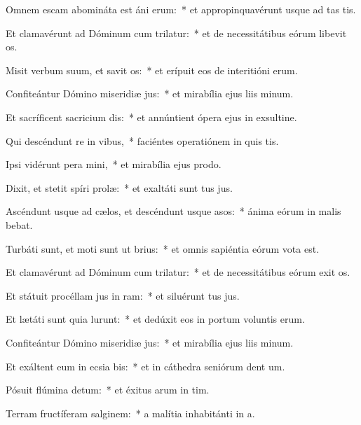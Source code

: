 \item Omnem escam abomináta est áni erum:~* et appropinquavérunt usque ad tas tis.
\item Et clamavérunt ad Dóminum cum trilatur:~* et de necessitátibus eórum libevit os.
\item Misit verbum suum, et savit os:~* et erípuit eos de interitióni erum.
\item Confiteántur Dómino miseridiæ jus:~* et mirabília ejus liis minum.
\item Et sacríficent sacricium dis:~* et annúntient ópera ejus in exsultine.
\item Qui descéndunt re in vibus,~* faciéntes operatiónem in quis tis.
\item Ipsi vidérunt pera mini,~* et mirabília ejus  prodo.
\item Dixit, et stetit spíri prolæ:~* et exaltáti sunt tus jus.
\item Ascéndunt usque ad cælos, et descéndunt usque  asos:~* ánima eórum in malis bebat.
\item Turbáti sunt, et moti sunt ut brius:~* et omnis sapiéntia eórum vota est.
\item Et clamavérunt ad Dóminum cum trilatur:~* et de necessitátibus eórum exit os.
\item Et státuit procéllam jus in ram:~* et siluérunt tus jus.
\item Et lætáti sunt quia lurunt:~* et dedúxit eos in portum voluntis erum.
\item Confiteántur Dómino miseridiæ jus:~* et mirabília ejus liis minum.
\item Et exáltent eum in ecsia bis:~* et in cáthedra seniórum dent um.
\item Pósuit flúmina  detum:~* et éxitus arum in tim.
\item Terram fructíferam  salginem:~* a malítia inhabitánti in a.

